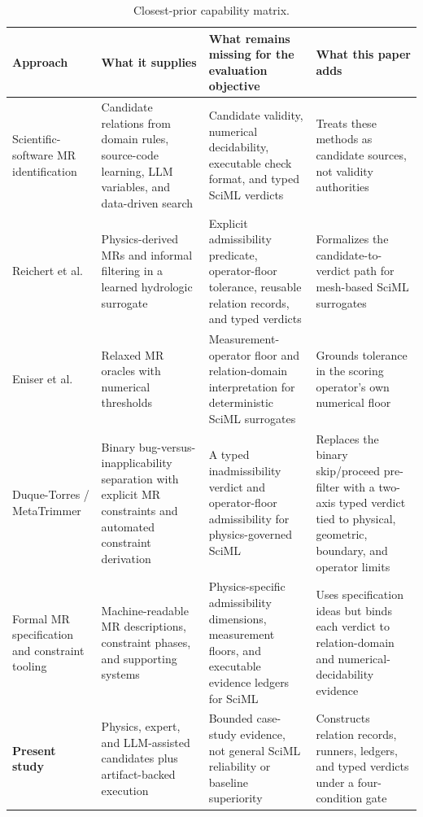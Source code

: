 \begin{table}[H]
\centering\footnotesize
\caption{Closest-prior capability matrix.}
\label{tab:closest-prior-positioning-supp}
\renewcommand{\arraystretch}{0.82}
\begin{tabularx}{\textwidth}{@{}>{\raggedright\arraybackslash}p{}YYY@{}}
\toprule
Approach & What it supplies & What remains missing for the evaluation objective & What this paper adds \\
\midrule
Scientific-software MR identification & Candidate relations from domain rules, source-code learning, LLM variables, and data-driven search & Candidate validity, numerical decidability, executable check format, and typed SciML verdicts & Treats these methods as candidate sources, not validity authorities \\
Reichert et al. & Physics-derived MRs and informal filtering in a learned hydrologic surrogate & Explicit admissibility predicate, operator-floor tolerance, reusable relation records, and typed verdicts & Formalizes the candidate-to-verdict path for mesh-based SciML surrogates \\
Eniser et al. & Relaxed MR oracles with numerical thresholds & Measurement-operator floor and relation-domain interpretation for deterministic SciML surrogates & Grounds tolerance in the scoring operator's own numerical floor \\
Duque-Torres / MetaTrimmer & Binary bug-versus-inapplicability separation with explicit MR constraints and automated constraint derivation & A typed inadmissibility verdict and operator-floor admissibility for physics-governed SciML & Replaces the binary skip/proceed pre-filter with a two-axis typed verdict tied to physical, geometric, boundary, and operator limits \\
Formal MR specification and constraint tooling & Machine-readable MR descriptions, constraint phases, and supporting systems & Physics-specific admissibility dimensions, measurement floors, and executable evidence ledgers for SciML & Uses specification ideas but binds each verdict to relation-domain and numerical-decidability evidence \\
\textbf{Present study} & Physics, expert, and LLM-assisted candidates plus artifact-backed execution & Bounded case-study evidence, not general SciML reliability or baseline superiority & Constructs relation records, runners, ledgers, and typed verdicts under a four-condition gate \\
\bottomrule
\end{tabularx}
\end{table}

